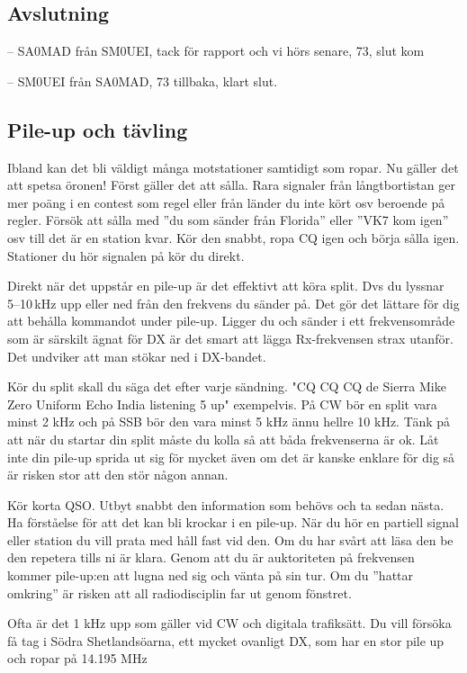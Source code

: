 \subsection{Avslutning}

-- SA0MAD från SM0UEI, tack för rapport och vi hörs senare, 73, slut kom

-- SM0UEI från SA0MAD, 73 tillbaka, klart slut.

\subsection{Pile-up och tävling}

Ibland kan det bli väldigt många motstationer samtidigt som ropar. Nu
gäller det att spetsa öronen! Först gäller det att sålla. Rara
signaler från långtbortistan ger mer poäng i en contest som regel
eller från länder du inte kört osv beroende på regler. Försök att
sålla med ''du som sänder från Florida'' eller ''VK7 kom igen'' osv
till det är en station kvar. Kör den snabbt, ropa CQ igen och börja
sålla igen. Stationer du hör signalen på kör du direkt.

Direkt när det uppstår en pile-up är det effektivt att köra split. Dvs
du lyssnar 5--10\,kHz upp eller ned från den frekvens du sänder
på. Det gör det lättare för dig att behålla kommandot under
pile-up. Ligger du och sänder i ett frekvensområde som är särskilt
ägnat för DX är det smart att lägga Rx-frekvensen strax utanför. Det
undviker att man stökar ned i DX-bandet.

Kör du split skall du säga det efter varje sändning. "CQ CQ CQ de Sierra Mike
Zero Uniform Echo India listening 5 up" exempelvis. På CW bör en split vara
minst 2 kHz och på SSB bör den vara minst 5 kHz ännu hellre 10 kHz. Tänk på att
när du startar din split måste du kolla så att båda frekvenserna är ok. Låt inte
din pile-up sprida ut sig för mycket även om det är kanske enklare för dig så är
risken stor att den stör någon annan.

Kör korta QSO. Utbyt snabbt den information som behövs och ta sedan nästa. Ha
förståelse för att det kan bli krockar i en pile-up. När du hör en partiell
signal eller station du vill prata med håll fast vid den. Om du har svårt att
läsa den be den repetera tills ni är klara. Genom att du är auktoriteten på
frekvensen kommer pile-up:en att lugna ned sig och vänta på sin tur. Om du
''hattar omkring'' är risken att all radiodisciplin far ut genom fönstret.

Ofta är det 1 kHz upp som gäller vid CW och digitala trafiksätt.  Du vill
försöka få tag i Södra Shetlandsöarna, ett mycket ovanligt DX, som har en stor
pile up och ropar på 14.195 MHz

